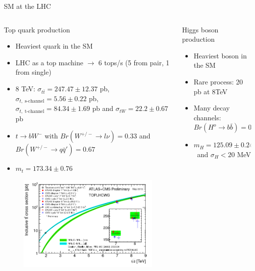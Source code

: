 \begin{frame}{SM at the LHC}
\vspace{-.3cm}
\begin{columns}

\begin{column}{.50\textwidth}
\begin{block}{Top quark production}
\begin{itemize}\tiny
\item Heaviest quark in the SM 
\item LHC as a top machine $\to$ 6 tops/s (5 from pair, 1 from single)
\item 8 TeV: $\sigma_{t\bar{t}}=247.47\pm12.37$ pb, $\sigma_{t,\; \text{s-channel}}=5.56\pm0.22$ pb, $\sigma_{t,\; \text{t-channel}}=84.34\pm1.69$ pb and $\sigma_{tW}=22.2\pm0.67$ pb
\item $t\to bW^{-}$ with $Br(W^{+/-}\to l\nu)=0.33$ and $Br(W^{+/-}\to q\bar{q}')=0.67$
\item $m_{t}=173.34\pm 0.76$ \GeVcc
\end{itemize}
\end{block}

\vspace{-.4cm}
\begin{figure}[!Hhtbp]
  \begin{center}
    \includegraphics[width=1.0\textwidth]{../figs/toplhcwg_ttxsec_sqrts_may2015.png}
  \end{center}
\end{figure}
\end{column}

\begin{column}{.50\textwidth}
\begin{block}{Higgs boson production}
\begin{itemize}\tiny
\item Heaviest boson in the SM 
\item Rare process: 20 pb at 8TeV
\item Many decay channels: $Br(H^{o}\to b\bar{b})=0.57$
\item $m_{H}=125.09\pm 0.24$ \GeVcc~and $\sigma_{H}<20$ MeV
\end{itemize}
\end{block}


\end{column}
\end{columns}
\end{frame}
